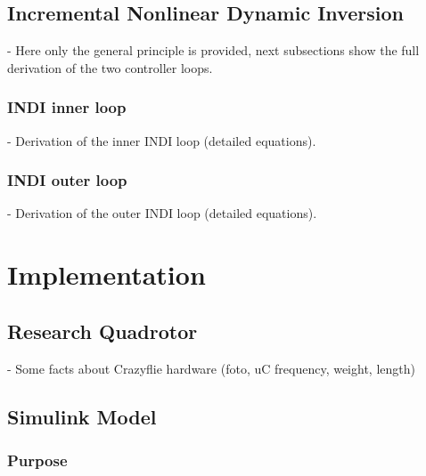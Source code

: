 \documentclass[11pt, a4paper, twoside]{report}
\begin{document}
\section{Incremental Nonlinear Dynamic Inversion} \label{sec:indi}

- Here only the general principle is provided, next subsections show the full derivation of the two controller loops.

\subsection{INDI inner loop} \label{subsec: indi_inner}

- Derivation of the inner INDI loop (detailed equations).

\subsection{INDI outer loop} \label{subsec: indi_outer}

- Derivation of the outer INDI loop (detailed equations).

\thispagestyle{fancy}



\chapter{Implementation} \label{cha:implementation}

\thispagestyle{fancy}

\section{Research Quadrotor} \label{sec:research_quadrotor}

- Some facts about Crazyflie hardware (foto, uC frequency, weight, length)

\section{Simulink Model} \label{sec:simulink_model}

\subsection{Purpose} \label{subsec:purpose}
\end{document}
